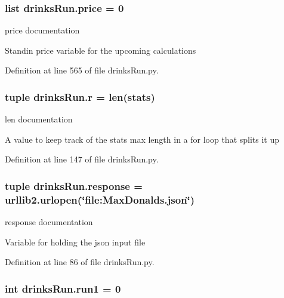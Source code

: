 \hypertarget{namespacedrinksRun_abb2dda63e5df841ca2bed090173e7ef3}{
\subsubsection[{price}]{\setlength{\rightskip}{0pt plus 5cm}list drinks\-Run.\-price = 0}}\label{namespacedrinksRun_abb2dda63e5df841ca2bed090173e7ef3}


price documentation 

Standin price variable for the upcoming calculations 

Definition at line 565 of file drinks\-Run.\-py.

\hypertarget{namespacedrinksRun_a348983d6aa82951c35c2faf31017093f}{
\subsubsection[{r}]{\setlength{\rightskip}{0pt plus 5cm}tuple drinks\-Run.\-r = len({\bf stats})}}\label{namespacedrinksRun_a348983d6aa82951c35c2faf31017093f}


len documentation 

A value to keep track of the stats max length in a for loop that splits it up 

Definition at line 147 of file drinks\-Run.\-py.

\hypertarget{namespacedrinksRun_a3166af8a07e6644e4bfb76ac05545d80}{
\subsubsection[{response}]{\setlength{\rightskip}{0pt plus 5cm}tuple drinks\-Run.\-response = urllib2.\-urlopen(\char`\"{}file\-:\-Max\-Donalds.\-json\char`\"{})}}\label{namespacedrinksRun_a3166af8a07e6644e4bfb76ac05545d80}


response documentation 

Variable for holding the json input file 

Definition at line 86 of file drinks\-Run.\-py.

\hypertarget{namespacedrinksRun_a6c7e6e961ffcfbcc6d0b34187d8de28f}{
\subsubsection[{run1}]{\setlength{\rightskip}{0pt plus 5cm}int drinks\-Run.\-run1 = 0}}\label{namespacedrinksRun_a6c7e6e961ffcfbcc6d0b34187d8de28f}


